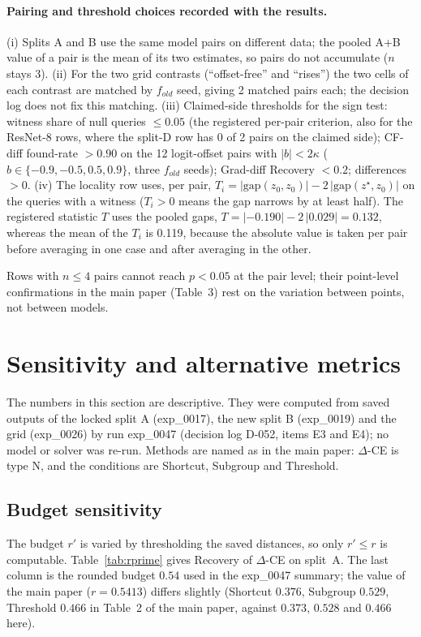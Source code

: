 \documentclass[10pt,a4paper]{article}
\theoremstyle{remark}
\newcommand{\DCE}{$\Delta$-CE}
\begin{document}
\paragraph{Pairing and threshold choices recorded with the results.} (i) Splits A and B use the same model pairs on different data; the pooled A+B value of a pair is the mean of its two estimates, so pairs do not accumulate ($n$ stays 3). (ii) For the two grid contrasts (``offset-free'' and ``rises'') the two cells of each contrast are matched by $f_{old}$ seed, giving 2 matched pairs each; the decision log does not fix this matching. (iii) Claimed-side thresholds for the sign test: witness share of null queries $\le0.05$ (the registered per-pair criterion, also for the ResNet-8 rows, where the split-D row has 0 of 2 pairs on the claimed side); CF-diff found-rate $>0.90$ on the 12 logit-offset pairs with $|b|<2\kappa$ ($b\in\{-0.9,-0.5,0.5,0.9\}$, three $f_{old}$ seeds); Grad-diff Recovery $<0.2$; differences $>0$. (iv) The locality row uses, per pair, $T_i=|\mathrm{gap}(z_0,z_0)|-2\,|\mathrm{gap}(z^\star,z_0)|$ on the queries with a witness ($T_i>0$ means the gap narrows by at least half). The registered statistic $T$ uses the pooled gaps, $T=|-0.190|-2\,|0.029|=0.132$, whereas the mean of the $T_i$ is 0.119, because the absolute value is taken per pair before averaging in one case and after averaging in the other.

Rows with $n\le4$ pairs cannot reach $p<0.05$ at the pair level; their point-level confirmations in the main paper (Table~3) rest on the variation between points, not between models.


\section{Sensitivity and alternative metrics}\label{sec:sens}

The numbers in this section are descriptive. They were computed from saved outputs of the locked split A (exp\_0017), the new split B (exp\_0019) and the grid (exp\_0026) by run exp\_0047 (decision log D-052, items E3 and E4); no model or solver was re-run. Methods are named as in the main paper: \DCE{} is type N, and the conditions are Shortcut, Subgroup and Threshold.

\subsection{Budget sensitivity}

The budget $r'$ is varied by thresholding the saved distances, so only $r'\le r$ is computable. Table~\ref{tab:rprime} gives Recovery of \DCE{} on split~A. The last column is the rounded budget $0.54$ used in the exp\_0047 summary; the value of the main paper ($r=0.5413$) differs slightly (Shortcut $0.376$, Subgroup $0.529$, Threshold $0.466$ in Table~2 of the main paper, against $0.373$, $0.528$ and $0.466$ here).
\end{document}
